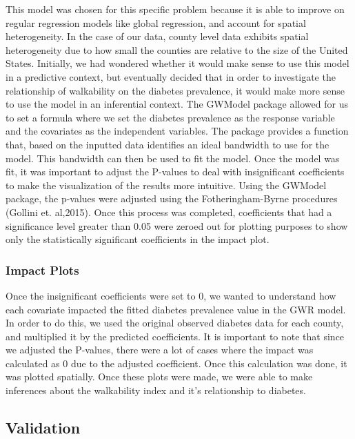 \documentclass[
]{article}
\begin{document}
This model was chosen for this specific problem because it is able to
improve on regular regression models like global regression, and account
for spatial heterogeneity. In the case of our data, county level data
exhibits spatial heterogeneity due to how small the counties are
relative to the size of the United States. Initially, we had wondered
whether it would make sense to use this model in a predictive context,
but eventually decided that in order to investigate the relationship of
walkability on the diabetes prevalence, it would make more sense to use
the model in an inferential context. The GWModel package allowed for us
to set a formula where we set the diabetes prevalence as the response
variable and the covariates as the independent variables. The package
provides a function that, based on the inputted data identifies an ideal
bandwidth to use for the model. This bandwidth can then be used to fit
the model. Once the model was fit, it was important to adjust the
P-values to deal with insignificant coefficients to make the
visualization of the results more intuitive. Using the GWModel package,
the p-values were adjusted using the Fotheringham-Byrne procedures
(Gollini et. al,2015). Once this process was completed, coefficients
that had a significance level greater than 0.05 were zeroed out for
plotting purposes to show only the statistically significant
coefficients in the impact plot.

\subsubsection{Impact Plots}\label{impact-plots}

Once the insignificant coefficients were set to 0, we wanted to
understand how each covariate impacted the fitted diabetes prevalence
value in the GWR model. In order to do this, we used the original
observed diabetes data for each county, and multiplied it by the
predicted coefficients. It is important to note that since we adjusted
the P-values, there were a lot of cases where the impact was calculated
as 0 due to the adjusted coefficient. Once this calculation was done, it
was plotted spatially. Once these plots were made, we were able to make
inferences about the walkability index and it's relationship to
diabetes.

\subsection{Validation}\label{validation}
\end{document}
